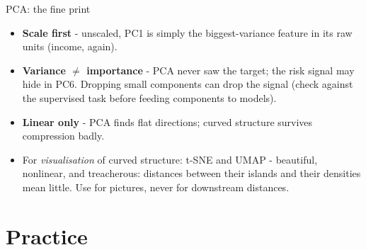 \documentclass[10pt,aspectratio=169]{beamer}
\begin{document}
\begin{frame}{PCA: the fine print}
  \begin{itemize}
    \item \textbf{Scale first} - unscaled, PC1 is simply the
          biggest-variance feature in its raw units (income, again).
    \item \textbf{Variance $\ne$ importance} - PCA never saw the target;
          the risk signal may hide in PC6. Dropping small components can
          drop the signal (check against the supervised task before
          feeding components to models).
    \item \textbf{Linear only} - PCA finds flat directions; curved
          structure survives compression badly.
    \item For \emph{visualisation} of curved structure: t-SNE and UMAP -
          beautiful, nonlinear, and \alert{treacherous}: distances between
          their islands and their densities mean little. Use for pictures,
          never for downstream distances.
  \end{itemize}
\end{frame}

\section{Practice}
\end{document}
